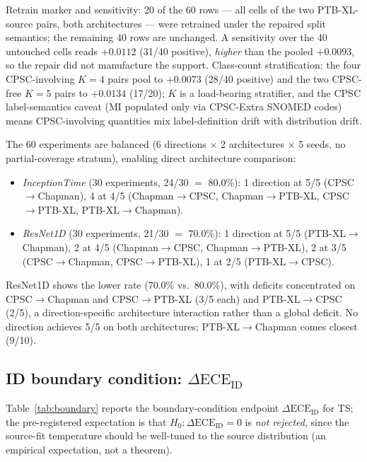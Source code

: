 \documentclass[review,12pt,nonatbib]{elsarticle}
\begin{document}
Retrain marker and sensitivity: 20 of the 60 rows --- all cells of the
two PTB-XL-source pairs, both architectures --- were retrained under
the repaired split semantics; the remaining 40 rows are unchanged. A
sensitivity over the 40 untouched cells reads $+0.0112$ (31/40
positive), \emph{higher} than the pooled $+0.0093$, so the repair did
not manufacture the support. Class-count stratification: the four
CPSC-involving $K{=}4$ pairs pool to $+0.0073$ (28/40 positive) and the
two CPSC-free $K{=}5$ pairs to $+0.0134$ (17/20); $K$ is a load-bearing
stratifier, and the CPSC label-semantics caveat (MI populated only via
CPSC-Extra SNOMED codes) means CPSC-involving quantities mix
label-definition drift with distribution drift.

The 60 experiments are
balanced (6 directions $\times$ 2 architectures $\times$ 5 seeds, no
partial-coverage stratum), enabling direct architecture comparison:
\begin{itemize}
    \item \emph{InceptionTime} (30 experiments, 24/30 $=$ 80.0\%):
    1 direction at 5/5 (CPSC$\rightarrow$Chapman), 4 at 4/5
    (Chapman$\rightarrow$CPSC, Chapman$\rightarrow$PTB-XL,
    CPSC$\rightarrow$PTB-XL, PTB-XL$\rightarrow$Chapman).
    \item \emph{ResNet1D} (30 experiments, 21/30 $=$ 70.0\%):
    1 direction at 5/5 (PTB-XL$\rightarrow$Chapman),
    2 at 4/5 (Chapman$\rightarrow$CPSC,
    Chapman$\rightarrow$PTB-XL), 2 at 3/5 (CPSC$\rightarrow$Chapman,
    CPSC$\rightarrow$PTB-XL), 1 at 2/5 (PTB-XL$\rightarrow$CPSC).
\end{itemize}
ResNet1D shows the lower rate (70.0\% vs.\ 80.0\%), with deficits
concentrated on CPSC$\rightarrow$Chapman and CPSC$\rightarrow$PTB-XL
(3/5 each) and PTB-XL$\rightarrow$CPSC (2/5), a direction-specific
architecture interaction rather than a global deficit. No direction
achieves 5/5 on both architectures; PTB-XL$\rightarrow$Chapman comes
closest (9/10).

\subsection{ID boundary condition: $\Delta\text{ECE}_{\text{ID}}$}
\label{sec:boundary}
Table~\ref{tab:boundary} reports the boundary-condition endpoint
$\Delta\text{ECE}_{\text{ID}}$ for TS; the pre-registered expectation is
that $H_0:\Delta\text{ECE}_{\text{ID}}=0$ is \emph{not rejected}, since
the source-fit temperature should be well-tuned to the source
distribution (an empirical expectation, not a theorem).
\end{document}
